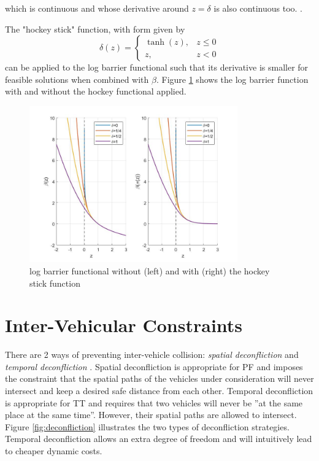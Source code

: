 which is continuous and whose derivative around $z=\delta$ is also continuous too. \cite{hauser2006barrier}.
\par The "hockey stick" function, with form given by
\begin{equation}
    \delta(z)= \begin{cases}
        \tanh(z), & z\leq 0 \\
        z, & z<0
    \end{cases}
\end{equation}
can be applied to the log barrier functional such that its derivative is smaller for feasible solutions when combined with $\beta$. Figure \ref{fig:logbarrierfunc} shows the log barrier function with and without the hockey functional applied.

\begin{figure}
\centering
\includegraphics[width=0.8\textwidth]{Images/logbarrierfunc.jpg}
\caption{log barrier functional without (left) and with (right) the hockey stick function}
\label{fig:logbarrierfunc}
\end{figure}

\section{Inter-Vehicular Constraints}
\label{sec:mindistintveh}

\par There are 2 ways of preventing inter-vehicle collision: \textit{spatial deconfliction} and \textit{temporal deconfliction} \cite{hausler2015mission}.
Spatial deconfliction is appropriate for \ac{PF} and imposes the constraint that the spatial paths of the vehicles under consideration will never intersect and keep a desired safe distance from each other. Temporal deconfliction is appropriate for \ac{TT} and requires that two vehicles will never be ”at the same place at the same time”. However, their spatial paths are allowed to intersect. Figure \ref{fig:deconfliction} illustrates the two types of deconfliction strategies. Temporal deconfliction allows an extra degree of freedom and will intuitively lead to cheaper dynamic costs.

